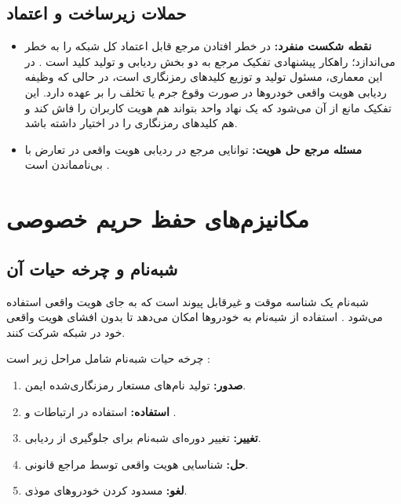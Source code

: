 \documentclass[12pt,a4paper]{article}
\begin{document}
\subsection{حملات زیرساخت و اعتماد}

\begin{itemize}
  \item \textbf{نقطه شکست منفرد:} در خطر افتادن مرجع قابل اعتماد کل شبکه را به خطر می‌اندازد؛ راهکار پیشنهادی تفکیک مرجع به دو بخش ردیابی و تولید کلید است \cite{rahmawatiagustinaSystematicLiteratureReview2025}. در این معماری،  مسئول تولید و توزیع کلیدهای رمزنگاری است، در حالی که  وظیفه ردیابی هویت واقعی خودروها در صورت وقوع جرم یا تخلف را بر عهده دارد. این تفکیک مانع از آن می‌شود که یک نهاد واحد بتواند هم هویت کاربران را فاش کند و هم کلیدهای رمزنگاری را در اختیار داشته باشد.
  \item \textbf{مسئله مرجع حل هویت:} توانایی مرجع در ردیابی هویت واقعی در تعارض با بی‌نامماندن است \cite{rahmawatiagustinaSystematicLiteratureReview2025}.
\end{itemize}

\section{مکانیزم‌های حفظ حریم خصوصی}

\subsection{شبه‌نام و چرخه حیات آن}

شبه‌نام  یک شناسه موقت و غیرقابل پیوند است که به جای هویت واقعی استفاده می‌شود \cite{rahmawatiagustinaSystematicLiteratureReview2025, luPseudonymChangingSocial2012}. استفاده از شبه‌نام به خودروها امکان می‌دهد تا بدون افشای هویت واقعی خود در شبکه شرکت کنند.

چرخه حیات شبه‌نام شامل مراحل زیر است \cite{rahmawatiagustinaSystematicLiteratureReview2025}:

\begin{enumerate}
  \item \textbf{صدور:} تولید نام‌های مستعار رمزنگاری‌شده ایمن.
  \item \textbf{استفاده:} استفاده در ارتباطات  و .
  \item \textbf{تغییر:} تغییر دوره‌ای شبه‌نام برای جلوگیری از ردیابی.
  \item \textbf{حل:} شناسایی هویت واقعی توسط مراجع قانونی.
  \item \textbf{لغو:} مسدود کردن خودروهای موذی.
\end{enumerate}
\end{document}
